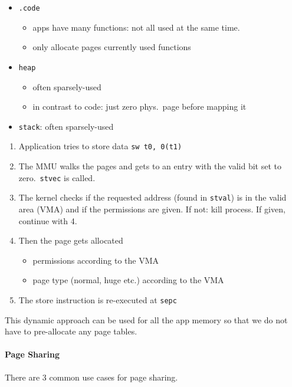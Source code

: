\newpar{}
\begin{itemize}
    \item \texttt{.code}
    \begin{itemize}
        \item apps have many functions: not all used at the same time.
        \item only allocate pages currently used functions
    \end{itemize}
    \item \texttt{heap}
    \begin{itemize}
        \item often sparsely-used
        \item in contrast to code: just zero phys.\ page before mapping it
    \end{itemize}
    \item \texttt{stack}: often sparsely-used
\end{itemize}

\newpar{}

\begin{enumerate}
    \item Application tries to store data
          \texttt{sw t0, 0(t1)}
    \item The MMU walks the pages and gets to an entry with the valid bit set to zero.~\texttt{stvec} is called.
    \item The kernel checks if the requested address (found in \texttt{stval}) is in the valid area (VMA) and if the permissions are given. If not: kill process. If given, continue with 4.
    \item Then the page gets allocated
    \begin{itemize}
        \item permissions according to the VMA
        \item page type (normal, huge etc.) according to the VMA
    \end{itemize}
    \item The store instruction is re-executed at \texttt{sepc}
\end{enumerate}

\newpar{}

This dynamic approach can be used for all the app memory so that we do not have to pre-allocate any page tables.

\paragraph{Page Sharing}
There are 3 common use cases for page sharing.

